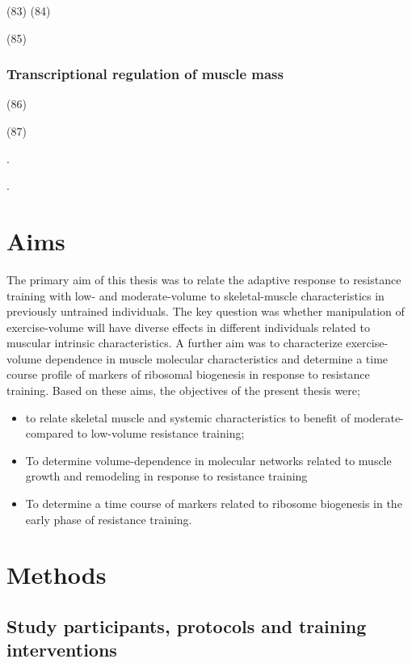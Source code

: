 \documentclass[twoside,10pt]{gihclass} %
\providecommand{\tightlist}{%
  \setlength{\itemsep}{0pt}\setlength{\parskip}{0pt}}
\begin{document}
(83)
(84)

(85)

\hypertarget{transcriptional-regulation-of-muscle-mass}{%
\subsection{Transcriptional regulation of muscle mass}\label{transcriptional-regulation-of-muscle-mass}}

(86)

(87)

.

.

\hypertarget{aims}{%
\chapter{Aims}\label{aims}}

The primary aim of this thesis was to relate the adaptive response to resistance training with low- and moderate-volume to skeletal-muscle characteristics in previously untrained individuals. The key question was whether manipulation of exercise-volume will have diverse effects in different individuals related to muscular intrinsic characteristics. A further aim was to characterize exercise-volume dependence in muscle molecular characteristics and determine a time course profile of markers of ribosomal biogenesis in response to resistance training. Based on these aims, the objectives of the present thesis were;
\begin{itemize}
\tightlist
\item
  to relate skeletal muscle and systemic characteristics to benefit of moderate- compared to low-volume resistance training;
\item
  To determine volume-dependence in molecular networks related to muscle growth and remodeling in response to resistance training
\item
  To determine a time course of markers related to ribosome biogenesis in the early phase of resistance training.
\end{itemize}
\hypertarget{methods}{%
\chapter{Methods}\label{methods}}

\hypertarget{study-participants-protocols-and-training-interventions}{%
\section{Study participants, protocols and training interventions}\label{study-participants-protocols-and-training-interventions}}
\end{document}
